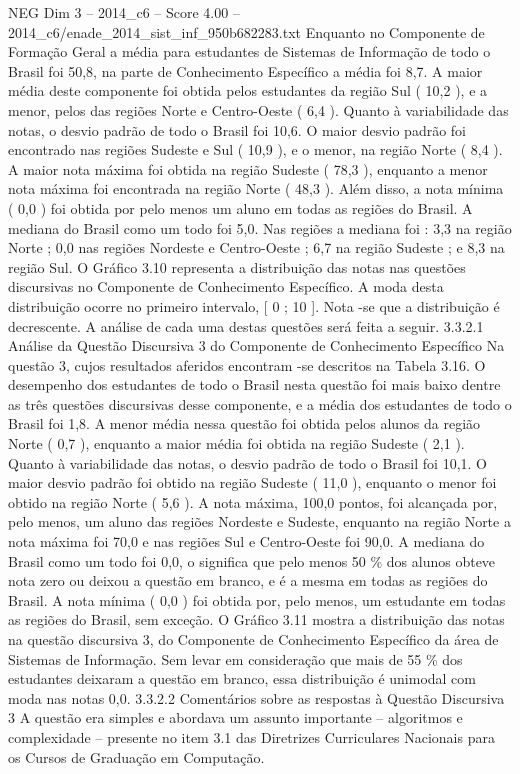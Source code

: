 \begin{textsample}{NEG Dim 3 – 2014\_c6 – Score 4.00 – 2014\_c6/enade\_2014\_sist\_inf\_950b682283.txt}
Enquanto no Componente de Formação Geral a média para estudantes de Sistemas de Informação de todo o Brasil foi 50,8, na parte de Conhecimento Específico a média foi 8,7.
A maior média deste componente foi obtida pelos estudantes da região Sul ( 10,2 ), e a menor, pelos das regiões Norte e Centro-Oeste ( 6,4 ).
Quanto à variabilidade das notas, o desvio padrão de todo o Brasil foi 10,6.
O maior desvio padrão foi encontrado nas regiões Sudeste e Sul ( 10,9 ), e o menor, na região Norte ( 8,4 ).
A maior nota máxima foi obtida na região Sudeste ( 78,3 ), enquanto a menor nota máxima foi encontrada na região Norte ( 48,3 ).
Além disso, a nota mínima ( 0,0 ) foi obtida por pelo menos um aluno em todas as regiões do Brasil.
A mediana do Brasil como um todo foi 5,0.
Nas regiões a mediana foi : 3,3 na região Norte ; 0,0 nas regiões Nordeste e Centro-Oeste ; 6,7 na região Sudeste ; e 8,3 na região Sul.
O Gráfico 3.10 representa a distribuição das notas nas questões discursivas no Componente de Conhecimento Específico.
A moda desta distribuição ocorre no primeiro intervalo, [ 0 ; 10 ].
Nota -se que a distribuição é decrescente.
A análise de cada uma destas questões será feita a seguir. 3.3.2.1 Análise da Questão Discursiva 3 do Componente de Conhecimento Específico Na questão 3, cujos resultados aferidos encontram -se descritos na Tabela 3.16.
O desempenho dos estudantes de todo o Brasil nesta questão foi mais baixo dentre as três questões discursivas desse componente, e a média dos estudantes de todo o Brasil foi 1,8.
A menor média nessa questão foi obtida pelos alunos da região Norte ( 0,7 ), enquanto a maior média foi obtida na região Sudeste ( 2,1 ).
Quanto à variabilidade das notas, o desvio padrão de todo o Brasil foi 10,1.
O maior desvio padrão foi obtido na região Sudeste ( 11,0 ), enquanto o menor foi obtido na região Norte ( 5,6 ).
A nota máxima, 100,0 pontos, foi alcançada por, pelo menos, um aluno das regiões Nordeste e Sudeste, enquanto na região Norte a nota máxima foi 70,0 e nas regiões Sul e Centro-Oeste foi 90,0.
A mediana do Brasil como um todo foi 0,0, o significa que pelo menos 50 \% dos alunos obteve nota zero ou deixou a questão em branco, e é a mesma em todas as regiões do Brasil.
A nota mínima ( 0,0 ) foi obtida por, pelo menos, um estudante em todas as regiões do Brasil, sem exceção.
O Gráfico 3.11 mostra a distribuição das notas na questão discursiva 3, do Componente de Conhecimento Específico da área de Sistemas de Informação.
Sem levar em consideração que mais de 55 \% dos estudantes deixaram a questão em branco, essa distribuição é unimodal com moda nas notas 0,0. 3.3.2.2 Comentários sobre as respostas à Questão Discursiva 3 A questão era simples e abordava um assunto importante – algoritmos e complexidade – presente no item 3.1 das Diretrizes Curriculares Nacionais para os Cursos de Graduação em Computação.

\end{textsample}
